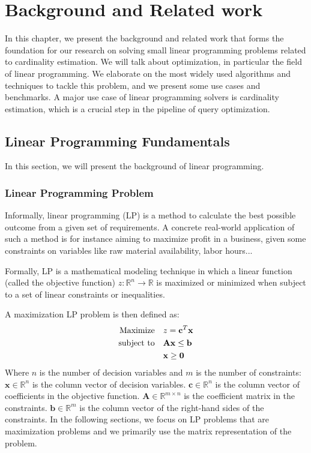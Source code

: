 
\chapter{Background and Related work}\label{chapter:relatedwork}

In this chapter, we present the background and related work that forms the foundation for our research on solving small linear programming problems related to cardinality estimation. We will talk about optimization, in particular the field of linear programming. We elaborate on the most widely used algorithms and techniques to tackle this problem, and we present some use cases and benchmarks. A major use case of linear programming solvers is cardinality estimation, which is a crucial step in the pipeline of query optimization.

\section{Linear Programming Fundamentals}
In this section, we will present the background of linear programming.
\subsection{Linear Programming Problem}
Informally, linear programming (LP) is a method to calculate the best possible outcome from a given set of requirements. A concrete real-world application of such a method is for instance aiming to maximize profit in a business, given some constraints on variables like raw material availability, labor hours...

Formally, LP is a mathematical modeling technique in which a linear function (called the objective function) \( z: \mathbb{R}^n \to \mathbb{R} \) is maximized or minimized when subject to a set of linear constraints or inequalities.

A maximization LP problem is then defined as:
\begin{align}
    \text{Maximize} \quad   & z = \mathbf{c}^T \mathbf{x} \notag            \\
    \text{subject to} \quad & \mathbf{A} \mathbf{x} \leq \mathbf{b} \notag  \\
                            & \mathbf{x} \geq \mathbf{0} \label{LP_Problem}
\end{align}
Where $n$ is the number of decision variables and $m$ is the number of constraints:
\(\mathbf{x} \in \mathbb{R}^n\) is the column vector of decision variables.
\(\mathbf{c} \in \mathbb{R}^n\) is the column vector of coefficients in the objective function.
\(\mathbf{A} \in \mathbb{R}^{m \times n}\) is the coefficient matrix in the constraints.
\(\mathbf{b} \in \mathbb{R}^m\) is the column vector of the right-hand sides of the constraints.
In the following sections, we focus on LP problems that are maximization problems and we primarily
use the matrix representation of the problem.

